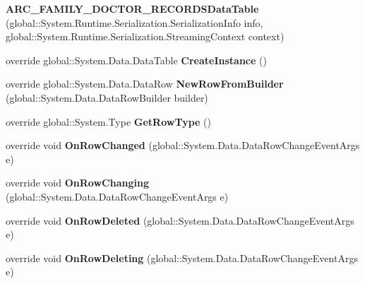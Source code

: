 \begin{CompactItemize}
\item 
\textbf{ARC\_\-FAMILY\_\-DOCTOR\_\-RECORDSDataTable} (global::System.Runtime.Serialization.SerializationInfo info, global::System.Runtime.Serialization.StreamingContext context)\label{class_automatic_medical_system_1_1_data_set2_1_1_a_r_c___f_a_m_i_l_y___d_o_c_t_o_r___r_e_c_o_r_d_s_data_table_99af40afcc7601d731f4ce55cb78c696}

\item 
override global::System.Data.DataTable \textbf{CreateInstance} ()\label{class_automatic_medical_system_1_1_data_set2_1_1_a_r_c___f_a_m_i_l_y___d_o_c_t_o_r___r_e_c_o_r_d_s_data_table_4dfcbb99b144aca0fc1eb46d6693c6b6}

\item 
override global::System.Data.DataRow \textbf{NewRowFromBuilder} (global::System.Data.DataRowBuilder builder)\label{class_automatic_medical_system_1_1_data_set2_1_1_a_r_c___f_a_m_i_l_y___d_o_c_t_o_r___r_e_c_o_r_d_s_data_table_dbab475c663dee80d029044f2d0417c3}

\item 
override global::System.Type \textbf{GetRowType} ()\label{class_automatic_medical_system_1_1_data_set2_1_1_a_r_c___f_a_m_i_l_y___d_o_c_t_o_r___r_e_c_o_r_d_s_data_table_3d3fd08d4dd4c90b1ebb47974670134d}

\item 
override void \textbf{OnRowChanged} (global::System.Data.DataRowChangeEventArgs e)\label{class_automatic_medical_system_1_1_data_set2_1_1_a_r_c___f_a_m_i_l_y___d_o_c_t_o_r___r_e_c_o_r_d_s_data_table_e77f36d2391089d8602dbae771bf1410}

\item 
override void \textbf{OnRowChanging} (global::System.Data.DataRowChangeEventArgs e)\label{class_automatic_medical_system_1_1_data_set2_1_1_a_r_c___f_a_m_i_l_y___d_o_c_t_o_r___r_e_c_o_r_d_s_data_table_5d27e492b60a77e746c9fc023f86c266}

\item 
override void \textbf{OnRowDeleted} (global::System.Data.DataRowChangeEventArgs e)\label{class_automatic_medical_system_1_1_data_set2_1_1_a_r_c___f_a_m_i_l_y___d_o_c_t_o_r___r_e_c_o_r_d_s_data_table_9366d80c5eccd15cebebfaceffac8ab4}

\item 
override void \textbf{OnRowDeleting} (global::System.Data.DataRowChangeEventArgs e)\label{class_automatic_medical_system_1_1_data_set2_1_1_a_r_c___f_a_m_i_l_y___d_o_c_t_o_r___r_e_c_o_r_d_s_data_table_2db4c29fc2472f915a56f086a46eb167}

\end{CompactItemize}

